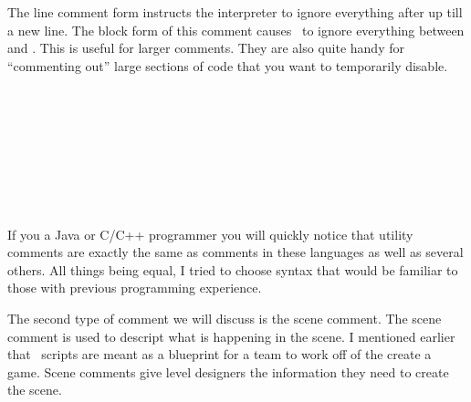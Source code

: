 \documentclass{book}
\begin{document}
The line comment form instructs the interpreter to ignore everything after \SSCode{//} up till a new line.  The block form of this comment causes \SSquaredInterpreter\ to ignore
everything between \SSCode{/*} and \SSCode{*/}.  This is useful for larger comments.  They are also quite handy for ``commenting out'' large sections of code that you want to temporarily disable.

\begin{SSCodeBox}
\scitea{} \\
\scitea{} \\
\scitek{/*} \\
 \\
 \\
 \\
\scitek{\}} \\
\scitek{*/}
\end{SSCodeBox}

If you a Java or C/C++ programmer you will quickly notice that utility comments are exactly the same as comments in these languages as well as several others.  All things being equal, I tried to choose syntax that would be familiar to those with previous programming experience.

 The second type of comment we will discuss is the scene comment. The scene comment is used to descript what is happening in the scene.  I mentioned earlier that \SSquared\ scripts are meant as a blueprint for a team to work off of the create a game.  Scene comments give level designers the information they need to create the scene.   
\end{document}
